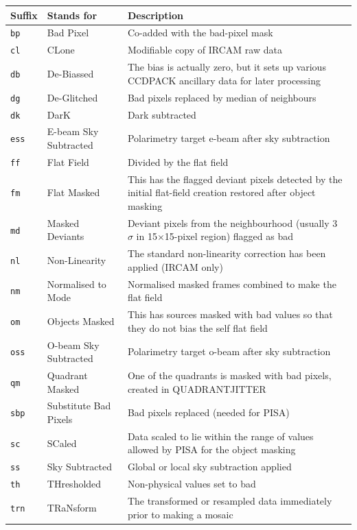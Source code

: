 \documentclass[twoside,11pt]{article}
\newcommand{\xref}[3]{#1}
\renewcommand{\_}{\texttt{\symbol{95}}}
\newcommand{\CCDPACK}{{\footnotesize CCDPACK}}
\newcommand{\PISA}{{\footnotesize PISA}}
\begin{document}
\begin{tabular}{llp{90mm}}
\hline
  Suffix  & Stands for        & Description \\ \hline
{\tt\_bp} & Bad Pixel         & Co-added with the bad-pixel mask \\
{\tt\_cl} & CLone             & Modifiable copy of IRCAM raw data \\
{\tt\_db} & De-Biassed        & The bias is actually zero, but it sets
                                up various \xref{\CCDPACK}{sun139}{}
                                ancillary data for later processing \\
{\tt\_dg} & De-Glitched       & Bad pixels replaced by median of neighbours \\
{\tt\_dk} & DarK              & Dark subtracted \\
{\tt\_ess} & E-beam Sky Subtracted & Polarimetry target e-beam after sky subtraction \\
{\tt\_ff} & Flat Field        & Divided by the flat field \\
{\tt\_fm} & Flat Masked       & This has the flagged deviant pixels
                                detected by the initial flat-field creation
                                restored after object masking \\
{\tt\_md} & Masked Deviants   & Deviant pixels from the neighbourhood (usually
                                3~$\sigma$ in 15$\times$15-pixel region) flagged as bad \\
{\tt\_nl} & Non-Linearity     & The standard non-linearity correction has
                                been applied (IRCAM only) \\
{\tt\_nm} & Normalised to Mode& Normalised masked frames combined to make the flat field \\
{\tt\_om} & Objects Masked    & This has sources masked with bad values
                                so that they do not bias the self flat field \\
{\tt\_oss} & O-beam Sky Subtracted & Polarimetry target o-beam after sky subtraction \\
{\tt\_qm} & Quadrant Masked   & One of the quadrants is masked with bad
                                pixels, created in QUADRANT\_JITTER \\
{\tt\_sbp}& Substitute Bad Pixels & Bad pixels replaced (needed for \PISA) \\
{\tt\_sc} & SCaled            & Data scaled to lie within the range of values
                                allowed by \xref{\PISA}{sun109}{} for the object 
                                masking \\
{\tt\_ss} & Sky Subtracted    & Global or local sky subtraction applied \\
{\tt\_th} & THresholded       & Non-physical values set to bad \\
{\tt\_trn}& TRaNsform         & The transformed or resampled data immediately 
                                prior to making a mosaic \\
\end{tabular}
\vspace*{17ex}
\end{document}

